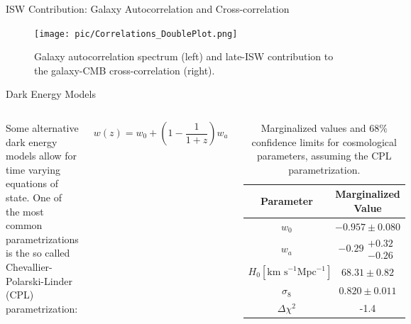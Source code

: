 \documentclass[serif, aspectratio=169]{beamer}
\begin{document}
\begin{frame}{ISW Contribution: Galaxy Autocorrelation and Cross-correlation}
    \begin{figure}
        \centering
        \texttt{[image: pic/Correlations\_DoublePlot.png]}
        \caption{Galaxy autocorrelation spectrum (left) and late-ISW contribution to the galaxy-CMB
cross-correlation (right).}
        \label{fig:ISWplots_Cgg_and_Ctg}
    \end{figure}
\end{frame}

\begin{frame}{Dark Energy Models}
	\begin{columns}
	
	Some alternative dark energy models allow for time varying equations of state. One of the most common parametrizations is the so called Chevallier-Polarski-Linder (CPL) parametrization:
	
	\begin{equation}
		w(z)=w_0+\left(1-\frac{1}{1+z}\right)w_a
	\end{equation}
	
	
	\begin{table}[!htb]
    \centering
    \begin{tabular}{cc} \hline
     Parameter & Marginalized Value \\ \hline
     $w_0$ & $-0.957\pm0.080$\\
     $w_a$ & $-0.29\substack{+0.32 \\ -0.26}$\\
     $H_0 [\text{km s}^{-1}\text{Mpc}^{-1}]$ & $68.31\pm0.82$ \\
     $\sigma_8$ & $0.820\pm 0.011$\\ \hline
     $\Delta \chi^2$ & -1.4 \\ \hline
    \end{tabular}
    \caption{Marginalized values and $68\%$ confidence limits for cosmological parameters, assuming the CPL parametrization.}
    \label{tab:planck_CPL}
\end{table}
	\end{columns}
\end{frame}
\end{document}
